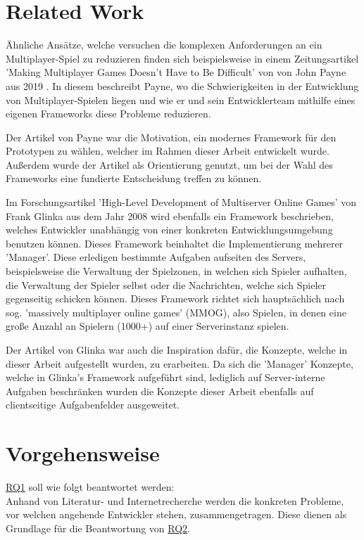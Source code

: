 \section{Related Work}

Ähnliche Ansätze, welche versuchen die komplexen Anforderungen an ein Multiplayer-Spiel zu reduzieren finden sich beispielsweise in einem Zeitungsartikel 'Making Multiplayer Games Doesn’t Have to Be Difficult' von von John Payne aus 2019  \cite{Payne.18.09.2019}. In diesem beschreibt Payne, wo die Schwierigkeiten in der Entwicklung von Multiplayer-Spielen liegen und wie er und sein Entwicklerteam mithilfe eines eigenen Frameworks diese Probleme reduzieren.

Der Artikel von Payne war die Motivation, ein modernes Framework für den Prototypen zu wählen, welcher im Rahmen dieser Arbeit entwickelt wurde. Außerdem wurde der Artikel als Orientierung genutzt, um bei der Wahl des Frameworks eine fundierte Entscheidung treffen zu können.

Im Forschungsartikel 'High-Level Development of Multiserver Online Games' von Frank Glinka aus dem Jahr 2008 \cite{Glinka.2008} wird ebenfalls ein Framework beschrieben, welches Entwickler unabhängig von einer konkreten Entwicklungsumgebung benutzen können. Dieses Framework beinhaltet die Implementierung mehrerer 'Manager'. Diese erledigen bestimmte Aufgaben aufseiten des Servers, beispielsweise die Verwaltung der Spielzonen, in welchen sich Spieler aufhalten, die Verwaltung der Spieler selbst oder die Nachrichten, welche sich Spieler gegenseitig schicken können. Dieses Framework richtet sich hauptsächlich nach sog. 'massively multiplayer online games' (MMOG), also Spielen, in denen eine große Anzahl an Spielern (1000+) auf einer Serverinstanz spielen.

Der Artikel von Glinka war auch die Inspiration dafür, die Konzepte, welche in dieser Arbeit aufgestellt wurden, zu erarbeiten. Da sich die 'Manager' Konzepte, welche in Glinka's Framework aufgeführt sind, lediglich auf Server-interne Aufgaben beschränken wurden die Konzepte dieser Arbeit ebenfalls auf clientseitige Aufgabenfelder ausgeweitet.

\section{Vorgehensweise}

\hyperref[RQ1]{RQ1} soll wie folgt beantwortet werden: \\
Anhand von Literatur- und Internetrecherche werden die konkreten Probleme, vor welchen angehende Entwickler stehen, zusammengetragen. Diese dienen als Grundlage für die Beantwortung von \hyperref[RQ2]{RQ2}.


